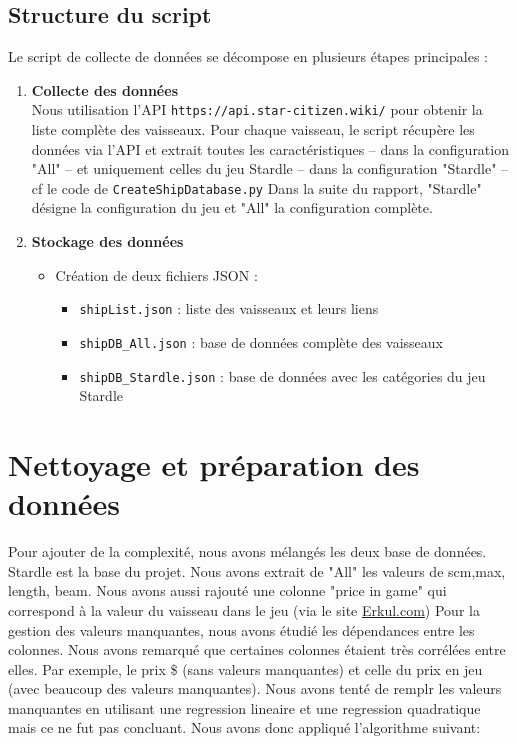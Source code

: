 \documentclass{article}
\begin{document}
\subsection{Structure du script}
Le script de collecte de données se décompose en plusieurs étapes principales :
\begin{enumerate}   
    \item \textbf{Collecte des données} \\
        Nous utilisation l'API \verb|https://api.star-citizen.wiki/| pour obtenir la liste complète des 
        vaisseaux.
        Pour chaque vaisseau, le script récupère les données via l'API et 
        extrait toutes les caractéristiques -- dans la configuration "All" -- 
        et uniquement celles du jeu Stardle -- dans la configuration  "Stardle" -- cf le code de \verb|CreateShipDatabase.py| \newline
        Dans la suite du rapport, "Stardle" désigne la configuration du jeu et "All" la configuration complète.
    \item \textbf{Stockage des données}
    
    \begin{itemize}
        \item Création de deux fichiers JSON :
        \begin{itemize}
            \item \verb|shipList.json| : liste des vaisseaux et leurs liens
            \item \verb|shipDB_All.json| : base de données complète des vaisseaux
            \item \verb|shipDB_Stardle.json| : base de données avec les catégories du jeu Stardle 
        \end{itemize}
    \end{itemize}
\end{enumerate}

\section{Nettoyage et préparation des données}

Pour ajouter de la complexité, nous avons mélangés les deux base de données.
Stardle est la base du projet. Nous avons extrait de "All" les valeurs de scm,max, length, beam. Nous avons aussi 
rajouté une colonne "price in game" qui correspond à la valeur du vaisseau dans le jeu (via le site 
\href{https://www.erkul.games/live/calculator}{Erkul.com})
\newline
Pour la gestion des valeurs manquantes, nous avons étudié les dépendances entre les colonnes.
Nous avons remarqué que certaines colonnes étaient très corrélées entre elles. Par exemple, le prix \$ (sans valeurs manquantes) 
et celle du prix en jeu (avec beaucoup des valeurs manquantes). Nous avons tenté de remplr les valeurs manquantes
en utilisant une regression lineaire et une regression quadratique mais ce ne fut pas concluant. 
Nous avons donc appliqué l'algorithme suivant: \\
\end{document}
